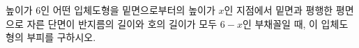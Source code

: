 높이가 $6$인 어떤 입체도형을 밑면으로부터의 높이가 $x$인 지점에서 밑면과 평행한 평면으로 자른 단면이 반지름의 길이와 호의 길이가 모두 $6-x$인 부채꼴일 때, 이 입체도형의 부피를 구하시오.

